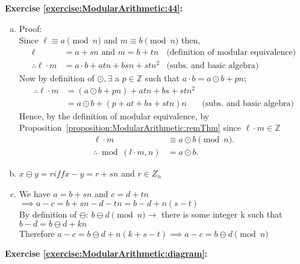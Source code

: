 
\noindent\textbf{Exercise \ref{exercise:ModularArithmetic:44}:} %
\begin{enumerate}[(a)]
\item
Proof:\\
Since $\ell \equiv a\pmod{n}$ and $m \equiv b\pmod{n}$ then,
\begin{align*}
\ell &= a + sn \text{\ and\ } m = b + tn &\text{(definition of modular equivalence)}\\ 
\therefore \ell \cdot m &= a \cdot b + atn + bsn +stn^{2} &\text{(subs. and basic algebra)}
\end{align*}
Now by definition of $\odot, \exists$ a $p\in {\mathbb{Z}}$ such that $a\cdot b = a\odot b + pn$; 
\begin{align*}
\therefore \ell \cdot m &= (a\odot b + pn) + atn + bs + stn^{2}& \\
&= a\odot b  + (p + at + bs + stn)n &\text{(subs. and basic algebra)}
\end{align*}
Hence, by the definition of modular equivalence, by Proposition~\ref{proposition:ModularArithmetic:remThm} since $\ell \cdot m \in {\mathbb{Z}}$\\
\begin{align*} 
\ell \cdot m &\equiv a \odot b\pmod{n}.\\
\therefore \bmod(l\cdot m, n) &= a\odot b.
\end{align*}

\item
$x \ominus y=r iff x-y=r+sn$ and $r \in Z_n$

\item
We have $a=b+sn$ and $c=d+tn$\\
$\implies a-c=b+sn-d-tn=b-d+n(s-t)$\\
By definition of $\ominus$: $b \ominus d \pmod{n} \to$ there is some integer k such that $b-d=b \ominus d +kn$\\
Therefore $a-c=b \ominus d +n(k+s-t) \implies a-c=b \ominus d \pmod{n}$
\end{enumerate}

\noindent\textbf{Exercise \ref{exercise:ModularArithmetic:diagram}:} 

